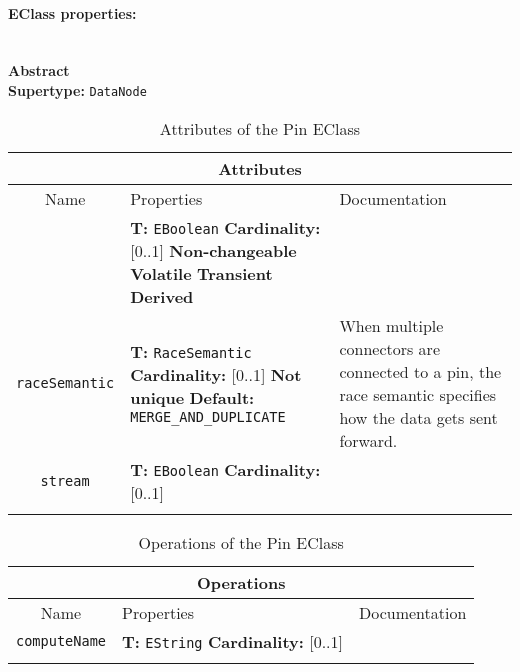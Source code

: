 \documentclass{article}
\begin{document}
\paragraph{EClass properties:} \hspace{0pt} \\ \indent
\textbf{Abstract}
\\
\textbf{Supertype: }\texttt{DataNode}
\begin{table}[H]
\footnotesize
\begin{tabularx}{\textwidth}{|c| p{4 cm} | X |}
\hline
\multicolumn{3}{|c|}{\textbf{Attributes}} \\
\hline
Name & Properties & Documentation \\ \hline \hline
\texttt{\color{blue}{gatewayPin}}
 & 
\textbf{T:} \texttt{EBoolean}
\newline
\textbf{Cardinality:} [0..1]
\newline
\textbf{Non-changeable}
\newline
\textbf{Volatile}
\newline
\textbf{Transient}
\newline
\textbf{Derived}
\newline
\textsc{\color{red}{MISSING DEFINITION!}}
 & \\ \hline
\texttt{raceSemantic}
 & 
\textbf{T:} \texttt{RaceSemantic}
\newline
\textbf{Cardinality:} [0..1]
\newline
\textbf{Not unique}
\newline
\textbf{Default:} \texttt{MERGE\_AND\_DUPLICATE}
 & When multiple connectors are connected to a pin, the race semantic specifies how the data gets sent forward.\\ \hline
\texttt{stream}
 & 
\textbf{T:} \texttt{EBoolean}
\newline
\textbf{Cardinality:} [0..1]
 & \\ \hline
\caption{Attributes of the Pin EClass}
\end{tabularx}
\label{e4smPinattr}
\end{table}
\begin{table}[H]
\footnotesize
\begin{tabularx}{\textwidth}{|c| p{4 cm} | X |}
\hline
\multicolumn{3}{|c|}{\textbf{Operations}} \\
\hline
Name & Properties & Documentation \\ \hline \hline
\texttt{computeName}
 & 
\textbf{T:} \texttt{EString}
\newline
\textbf{Cardinality:} [0..1]
 & \\ \hline
\caption{Operations of the Pin EClass}
\end{tabularx}
\label{e4smPinop}
\end{table}
\end{document}
